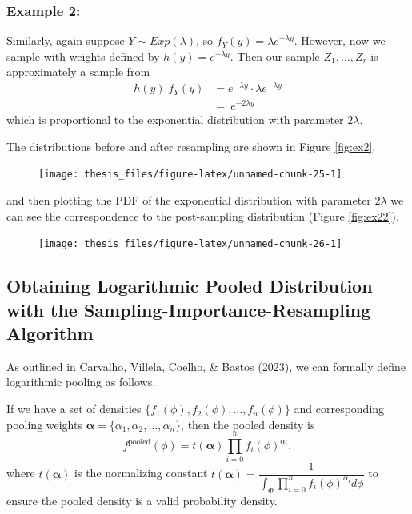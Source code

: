 \documentclass[12pt,twoside]{smiththesis}
\begin{document}
\hypertarget{example-2}{%
\subsubsection{Example 2:}\label{example-2}}

Similarly, again suppose \(Y \sim Exp(\lambda)\), so \(f_Y(y) = \lambda e^{-\lambda y}\). However, now we sample with weights defined by \(h(y)= e^{-\lambda y}\).
Then our sample \(Z_1,\dots,Z_r\) is approximately a sample from
\begin{align*} 
h(y) \; f_Y(y) &=   e^{-\lambda y} \cdot \lambda e^{-\lambda y}\\
&= \ e^{-2 \lambda y}  
\end{align*}
which is proportional to the exponential distribution with parameter \(2\lambda\).

The distributions before and after resampling are shown in Figure \ref{fig:ex2}.
\begin{figure}

{\centering \texttt{[image: thesis\_files/figure-latex/unnamed-chunk-25-1]} 

}

\caption{\label{fig:ex2}}\label{fig:unnamed-chunk-25}
\end{figure}
and then plotting the PDF of the exponential distribution with parameter \(2\lambda\) we can see the correspondence to the post-sampling distribution (Figure \ref{fig:ex22}).
\begin{figure}

{\centering \texttt{[image: thesis\_files/figure-latex/unnamed-chunk-26-1]} 

}

\caption{\label{fig:ex22}}\label{fig:unnamed-chunk-26}
\end{figure}
\newpage

\hypertarget{logpooled}{%
\subsection{Obtaining Logarithmic Pooled Distribution with the Sampling-Importance-Resampling Algorithm}\label{logpooled}}

As outlined in Carvalho, Villela, Coelho, \& Bastos (2023), we can formally define logarithmic pooling as follows.

If we have a set of densities \(\{ f_1(\phi), f_2(\phi), \ldots, f_n(\phi)\}\) and corresponding pooling weights \(\boldsymbol{\alpha}=\{\alpha_1, \alpha_2, \ldots, \alpha_n\}\), then the pooled density is
\[f^{\text{pooled}}(\phi) = t(\boldsymbol{\alpha}) \prod_{i=0}^n f_i(\phi)^{\alpha_i},\]
where \(t(\boldsymbol{\alpha})\) is the normalizing constant \(t(\boldsymbol{\alpha}) = \dfrac{1}{ \int_{\Phi}\prod_{i=0}^n f_i(\phi)^{\alpha_i} d\phi}\) to ensure the pooled density is a valid probability density.
\end{document}
